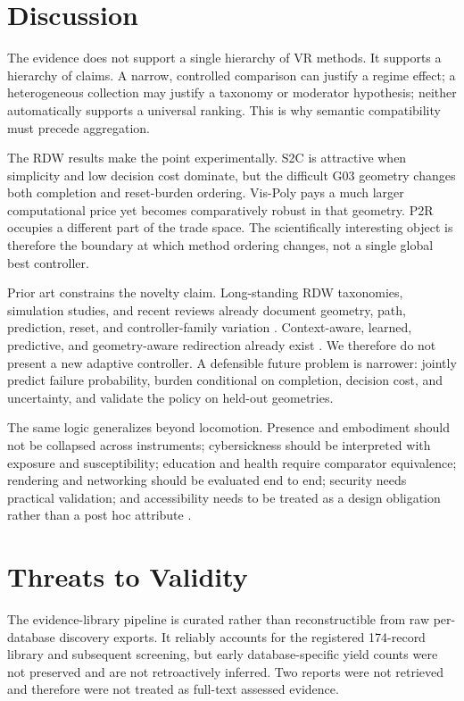 \section{Discussion}
The evidence does not support a single hierarchy of VR methods. It supports a hierarchy of claims. A narrow, controlled comparison can justify a regime effect; a heterogeneous collection may justify a taxonomy or moderator hypothesis; neither automatically supports a universal ranking. This is why semantic compatibility must precede aggregation.

The RDW results make the point experimentally. S2C is attractive when simplicity and low decision cost dominate, but the difficult G03 geometry changes both completion and reset-burden ordering. Vis-Poly pays a much larger computational price yet becomes comparatively robust in that geometry. P2R occupies a different part of the trade space. The scientifically interesting object is therefore the boundary at which method ordering changes, not a single global best controller.

Prior art constrains the novelty claim. Long-standing RDW taxonomies, simulation studies, and recent reviews already document geometry, path, prediction, reset, and controller-family variation \cite{Nilsson2018FifteenYears,Hodgson2013FourApproaches,Azmandian2015PhysicalSpace,Prinz2023Taxonomies}. Context-aware, learned, predictive, and geometry-aware redirection already exist \cite{Azmandian2022Adaptive,Strauss2020RL,Chen2024APFS2T,Wang2026DGMRDW}. We therefore do not present a new adaptive controller. A defensible future problem is narrower: jointly predict failure probability, burden conditional on completion, decision cost, and uncertainty, and validate the policy on held-out geometries.

The same logic generalizes beyond locomotion. Presence and embodiment should not be collapsed across instruments; cybersickness should be interpreted with exposure and susceptibility; education and health require comparator equivalence; rendering and networking should be evaluated end to end; security needs practical validation; and accessibility needs to be treated as a design obligation rather than a post hoc attribute \cite{Caserman2021Cybersickness,Merchant2014VREducationMeta,Woon2021NursingVR,Wang2023FoveatedSurvey,Giaretta2025VRSecurity,Dudley2023InclusiveImmersion}.

\section{Threats to Validity}
The evidence-library pipeline is curated rather than reconstructible from raw per-database discovery exports. It reliably accounts for the registered 174-record library and subsequent screening, but early database-specific yield counts were not preserved and are not retroactively inferred. Two reports were not retrieved and therefore were not treated as full-text assessed evidence.

